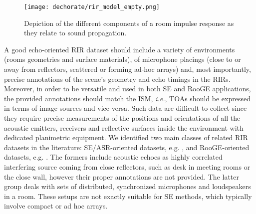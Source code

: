 \begin{figure}
    \centering
    \texttt{[image: dechorate/rir\_model\_empty.png]}
    \caption{Depiction of the different components of a room impulse response as they relate to sound propagation.}
    \label{fig:rir}
\end{figure}

A good echo-oriented RIR dataset should include a variety of environments (rooms geometries and surface materials), of microphone placings (close to or away from reflectors, scattered or forming ad-hoc arrays) and, most importantly, precise annotations of the scene's geometry and echo timings in the RIRs.
Moreover, in order to be versatile and used in both SE and RooGE applications, the provided annotations should match the ISM, \textit{i.e.}, TOAs should be expressed in terms of image sources and vice-versa. Such data are difficult to collect since they require precise measurements of the positions and orientations of all the acoustic emitters, receivers and reflective surfaces inside the environment with dedicated planimetric equipment. We identified two main classes of related RIR datasets in the literature: SE/ASR-oriented datasets, e.g. , and RooGE-oriented datasets, e.g. . The formers include acoustic echoes as highly correlated interfering source coming from close reflectors, such as desk in meeting rooms or the close wall, however their proper annotations are not provided.
The latter group deals with sets of distributed, synchronized microphones and loudspeakers in a room.
These setups are not exactly suitable for SE methods, which typically involve compact or ad hoc arrays.

